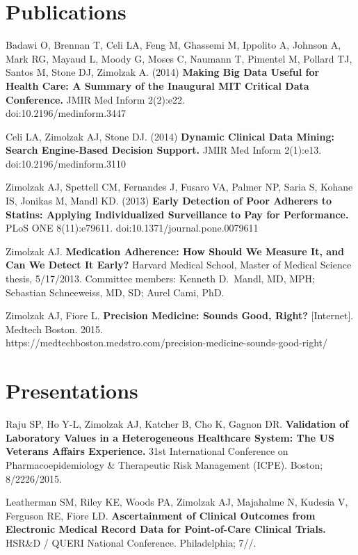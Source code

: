 \documentclass[10pt]{article}
\begin{document}
\section*{Publications}
Badawi O, Brennan T, Celi LA, Feng M, Ghassemi M, Ippolito A, Johnson
A, Mark RG, Mayaud L, Moody G, Moses C, Naumann T, Pimentel M, Pollard
TJ, Santos M, Stone DJ, Zimolzak A. (2014) \textbf{Making Big Data
  Useful for Health Care: A Summary of the Inaugural MIT Critical Data
  Conference.} JMIR Med Inform 2(2):e22.\\
doi:10.2196/medinform.3447

Celi LA, Zimolzak AJ, Stone DJ. (2014) \textbf{Dynamic Clinical Data
  Mining: Search Engine-Based Decision Support.} JMIR Med Inform
2(1):e13. doi:10.2196/medinform.3110

Zimolzak AJ, Spettell CM, Fernandes J, Fusaro VA, Palmer NP, Saria S,
Kohane IS, Jonikas M, Mandl KD. (2013) \textbf{Early Detection of Poor
  Adherers to Statins: Applying Individualized Surveillance to Pay for
  Performance.} PLoS ONE 8(11):e79611. doi:10.1371/journal.pone.0079611

Zimolzak AJ. \textbf{Medication Adherence: How Should We Measure It,
  and Can We Detect It Early?} Harvard Medical School, Master of
Medical Science thesis, 5/17/2013. Committee members: Kenneth
D.\ Mandl, MD, MPH; Sebastian Schneeweiss, MD, SD; Aurel Cami, PhD.

Zimolzak AJ, Fiore L. \textbf{Precision Medicine: Sounds Good, Right?}
[Internet]. Medtech Boston. 2015.\\
https://medtechboston.medstro.com/precision-medicine-sounds-good-right/

\section*{Presentations} %

Raju SP, Ho Y-L, Zimolzak AJ, Katcher B, Cho K, Gagnon DR.
\textbf{Validation of Laboratory Values in a Heterogeneous Healthcare
  System: The US Veterans Affairs Experience.} 31st International
Conference on Pharmacoepidemiology \& Therapeutic Risk Management
(ICPE). Boston; 8/22\ndash{}26/2015.

Leatherman SM, Riley KE, Woods PA, Zimolzak AJ, Majahalme N, Kudesia
V, Ferguson RE, Fiore LD. \textbf{Ascertainment of Clinical Outcomes
  from Electronic Medical Record Data for Point-of-Care Clinical
  Trials.} HSR\&D / QUERI National Conference. Philadelphia;
7/\ndash{}/.
\end{document}
